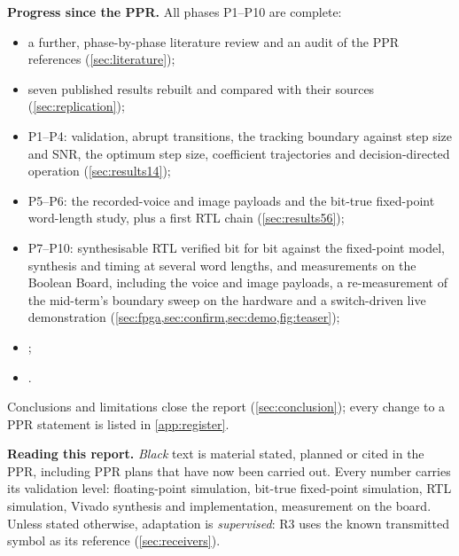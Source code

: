 \noindent\textbf{Progress since the PPR.} All phases P1--P10 are complete:
\begin{itemize}\itemsep0pt
\item a further, phase-by-phase literature review and an audit of the PPR references (\cref{sec:literature});
\item seven published results rebuilt and compared with their sources (\cref{sec:replication});
\item P1--P4: validation, abrupt transitions, the tracking boundary against step size and SNR, the optimum step size, coefficient trajectories and decision-directed operation (\cref{sec:results14});
\item P5--P6: the recorded-voice and image payloads and the bit-true fixed-point word-length study, plus a first RTL chain (\cref{sec:results56});
\item P7--P10: synthesisable RTL verified bit for bit against the fixed-point model, synthesis and timing at several word lengths, and measurements on the Boolean Board, including the voice and image payloads, a re-measurement of the mid-term's boundary sweep on the hardware and a switch-driven live demonstration (\cref{sec:fpga,sec:confirm,sec:demo,fig:teaser});
\item {};
\item {}.
\end{itemize}
Conclusions and limitations close the report (\cref{sec:conclusion}); every change to a PPR statement is listed in \cref{app:register}.

\noindent\textbf{Reading this report.} \emph{Black} text is material stated, planned or cited in the PPR, including PPR plans that have now been carried out.  Every number carries its validation level:  floating-point simulation,  bit-true fixed-point simulation,  RTL simulation,  Vivado synthesis and implementation,  measurement on the board. Unless stated otherwise, adaptation is \emph{supervised}: R3 uses the known transmitted symbol as its reference (\cref{sec:receivers}).
